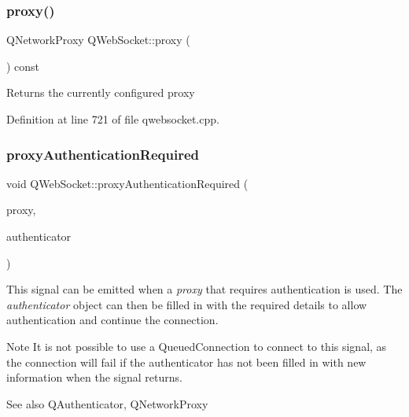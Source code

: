 \mbox{\label{class_q_web_socket_a6451f984f2eb43cbc5fcd6f0dd4421d9}} 
\subsubsection{\texorpdfstring{proxy()}{proxy()}}
{\footnotesize\ttfamily Q\+Network\+Proxy Q\+Web\+Socket\+::proxy (\begin{DoxyParamCaption}{ }\end{DoxyParamCaption}) const}

Returns the currently configured proxy 

Definition at line 721 of file qwebsocket.\+cpp.

\mbox{\label{class_q_web_socket_acd5c2e589b072ef513b67c29fd69976c}} 
\subsubsection{\texorpdfstring{proxy\+Authentication\+Required}{proxyAuthenticationRequired}}
{\footnotesize\ttfamily void Q\+Web\+Socket\+::proxy\+Authentication\+Required (\begin{DoxyParamCaption}\item[{const Q\+Network\+Proxy \&}]{proxy,  }\item[{Q\+Authenticator $\ast$}]{authenticator }\end{DoxyParamCaption})\hspace{0.3cm}{\ttfamily [signal]}}

This signal can be emitted when a {\itshape proxy} that requires authentication is used. The {\itshape authenticator} object can then be filled in with the required details to allow authentication and continue the connection.

\begin{DoxyNote}{Note}
It is not possible to use a Queued\+Connection to connect to this signal, as the connection will fail if the authenticator has not been filled in with new information when the signal returns.
\end{DoxyNote}
\begin{DoxySeeAlso}{See also}
Q\+Authenticator, Q\+Network\+Proxy 
\end{DoxySeeAlso}


